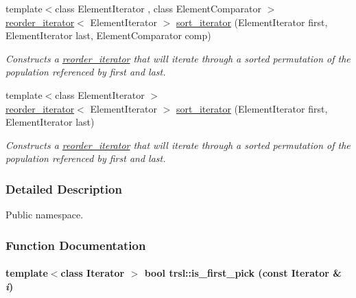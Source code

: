 \begin{DoxyCompactItemize}
{\footnotesize template$<$class ElementIterator , class ElementComparator $>$ }\\\hyperlink{classtrsl_1_1reorder__iterator}{reorder\_\-iterator}$<$ ElementIterator $>$ \hyperlink{namespacetrsl_aef0a3d23fddf651e4e6d01999da0e908}{sort\_\-iterator} (ElementIterator first, ElementIterator last, ElementComparator comp)
\begin{DoxyCompactList}\small\item\em Constructs a \hyperlink{classtrsl_1_1reorder__iterator}{reorder\_\-iterator} that will iterate through a sorted permutation of the population referenced by {\ttfamily first} and {\ttfamily last}. \item\end{DoxyCompactList}\item 
{\footnotesize template$<$class ElementIterator $>$ }\\\hyperlink{classtrsl_1_1reorder__iterator}{reorder\_\-iterator}$<$ ElementIterator $>$ \hyperlink{namespacetrsl_afa98318aa74d3477b81e603fcf1c285b}{sort\_\-iterator} (ElementIterator first, ElementIterator last)
\begin{DoxyCompactList}\small\item\em Constructs a \hyperlink{classtrsl_1_1reorder__iterator}{reorder\_\-iterator} that will iterate through a sorted permutation of the population referenced by {\ttfamily first} and {\ttfamily last}. \item\end{DoxyCompactList}\end{DoxyCompactItemize}


\subsubsection{Detailed Description}
Public namespace. 

\subsubsection{Function Documentation}
\hypertarget{namespacetrsl_a412db7961cfc65236d71610635038225}{
\paragraph[{is\_\-first\_\-pick}]{\setlength{\rightskip}{0pt plus 5cm}template$<$class Iterator $>$ bool trsl::is\_\-first\_\-pick (const Iterator \& {\em i})}\hfill}
\label{namespacetrsl_a412db7961cfc65236d71610635038225}


